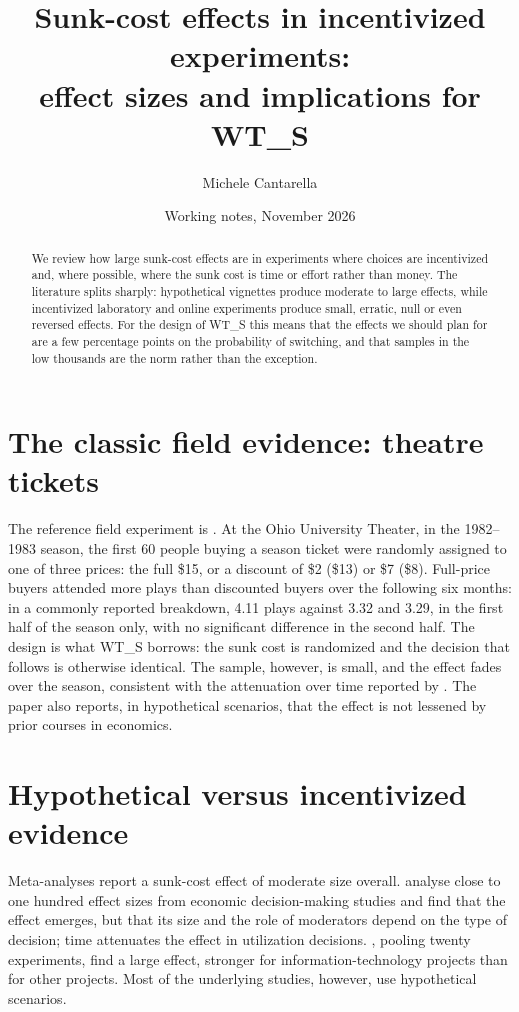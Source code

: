 \documentclass[11pt]{article}
\title{Sunk-cost effects in incentivized experiments:\\ effect sizes and implications for WT\_S}
\author{Michele Cantarella}
\date{Working notes, November 2026}
\begin{document}
\maketitle

\begin{abstract}
We review how large sunk-cost effects are in experiments where choices are incentivized and, where possible, where the sunk cost is time or effort rather than money. The literature splits sharply: hypothetical vignettes produce moderate to large effects, while incentivized laboratory and online experiments produce small, erratic, null or even reversed effects. For the design of WT\_S this means that the effects we should plan for are a few percentage points on the probability of switching, and that samples in the low thousands are the norm rather than the exception.
\end{abstract}

\section{The classic field evidence: theatre tickets}

The reference field experiment is \citet{arkes1985}. At the Ohio University Theater, in the 1982--1983 season, the first 60 people buying a season ticket were randomly assigned to one of three prices: the full \$15, or a discount of \$2 (\$13) or \$7 (\$8). Full-price buyers attended more plays than discounted buyers over the following six months: in a commonly reported breakdown, 4.11 plays against 3.32 and 3.29, in the first half of the season only, with no significant difference in the second half. The design is what WT\_S borrows: the sunk cost is randomized and the decision that follows is otherwise identical. The sample, however, is small, and the effect fades over the season, consistent with the attenuation over time reported by \citet{roth2015}. The paper also reports, in hypothetical scenarios, that the effect is not lessened by prior courses in economics.

\section{Hypothetical versus incentivized evidence}

Meta-analyses report a sunk-cost effect of moderate size overall. \citet{roth2015} analyse close to one hundred effect sizes from economic decision-making studies and find that the effect emerges, but that its size and the role of moderators depend on the type of decision; time attenuates the effect in utilization decisions. \citet{wang2007}, pooling twenty experiments, find a large effect, stronger for information-technology projects than for other projects. Most of the underlying studies, however, use hypothetical scenarios.
\end{document}
